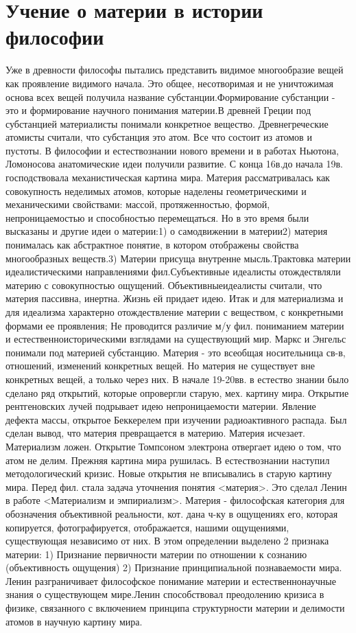 \documentclass[12pt]{article}
\begin{document}
\section{Учение о материи в истории философии}
Уже в древности философы пытались представить видимое многообразие вещей как проявление видимого
начала. Это общее, несотворимая и не уничтожимая основа всех вещей получила название
субстанции.Формирование субстанции - это и формирование научного понимания материи.В древней Греции
под субстанцией материалисты понимали конкретное вещество. Древнегреческие атомисты считали, что
субстанция это атом. Все что состоит из атомов и пустоты. В философии и естествознании нового времени и в
работах Ньютона, Ломоносова анатомические идеи получили развитие.
 С конца 16в.до начала 19в. господствовала механистическая картина мира. Материя рассматривалась как
совокупность неделимых атомов, которые наделены геометрическими и механическими свойствами: массой,
протяженностью, формой, непроницаемостью и способностью перемещаться.
Но в это время были высказаны и другие идеи о материи:1) о самодвижении в материи2) материя понималась
как абстрактное понятие, в котором отображены свойства многообразных веществ.3) Материи присуща
внутренне мысль.Трактовка материи идеалистическими направлениями фил.Субъективные идеалисты
отождествляли материю с совокупностью ощущений. Объективныеидеалисты считали, что материя пассивна,
инертна. Жизнь ей придает идею. Итак и для материализма и для идеализма характерно отождествление
материи с веществом, с конкретными формами ее проявления; Не проводится различие м/у фил. пониманием
материи и естественноисторическими взглядами на существующий мир. Маркс и Энгельс понимали под
материей субстанцию.
 Материя - это всеобщая носительница св-в, отношений, изменений конкретных вещей. Но материя не
существует вне конкретных вещей, а только через них. В начале 19-20вв. в естество знании было сделано ряд
открытий, которые опровергли старую, мех. картину мира. Открытие рентгеновских лучей подрывает идею
непроницаемости материи. Явление дефекта массы, открытое Беккерелем при изучении радиоактивного
распада. Был сделан вывод, что материя превращается в материю. Материя исчезает. Материализм ложен.
Открытие Томпсоном электрона отвергает идею о том, что атом не делим. Прежняя картина мира рушилась. В
естествознании наступил методологический кризис. Новые открытия не вписывались в старую картину мира.
Перед фил. стала задача уточнения понятия <материя>.
 Это сделал Ленин в работе <Материализм и эмпириализм>. Материя - философская категория для
обозначения объективной реальности, кот. дана ч-ку в ощущениях его, которая копируется, фотографируется,
отображается, нашими ощущениями, существующая независимо от них. В этом определении выделено 2
признака материи:
1) Признание первичности материи по отношении к сознанию (объективность ощущения) 
2) Признание принципиальной познаваемости мира. Ленин разграничивает философское понимание материи и
естественнонаучные знания о существующем мире.Ленин способствовал преодолению кризиса в физике,
связанного с включением принципа структурности материи и делимости атомов в научную картину мира.
\end{document}
